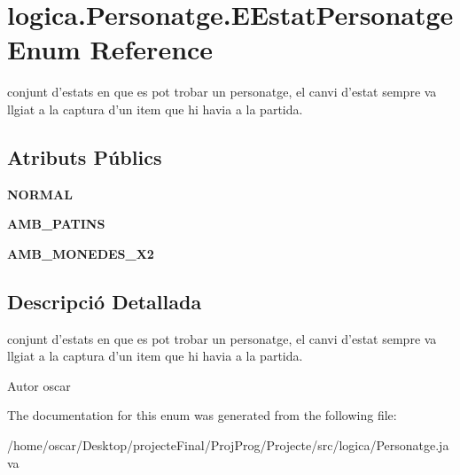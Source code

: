 \hypertarget{enumlogica_1_1_personatge_1_1_e_estat_personatge}{\section{logica.\+Personatge.\+E\+Estat\+Personatge Enum Reference}
\label{enumlogica_1_1_personatge_1_1_e_estat_personatge}
}


conjunt d'estats en que es pot trobar un personatge, el canvi d'estat sempre va llgiat a la captura d'un item que hi havia a la partida.  


\subsection*{Atributs Públics}
\begin{DoxyCompactItemize}
\item 
\hypertarget{enumlogica_1_1_personatge_1_1_e_estat_personatge_a49d6707f77621ec0cf2e87fe0c3c35b6}{{\bfseries N\+O\+R\+M\+A\+L}}\label{enumlogica_1_1_personatge_1_1_e_estat_personatge_a49d6707f77621ec0cf2e87fe0c3c35b6}

\item 
\hypertarget{enumlogica_1_1_personatge_1_1_e_estat_personatge_a40e2b5b6b8e3353416efee27e6968dc2}{{\bfseries A\+M\+B\+\_\+\+P\+A\+T\+I\+N\+S}}\label{enumlogica_1_1_personatge_1_1_e_estat_personatge_a40e2b5b6b8e3353416efee27e6968dc2}

\item 
\hypertarget{enumlogica_1_1_personatge_1_1_e_estat_personatge_ab999766c5100bbcaa40fa54069c8f4d3}{{\bfseries A\+M\+B\+\_\+\+M\+O\+N\+E\+D\+E\+S\+\_\+\+X2}}\label{enumlogica_1_1_personatge_1_1_e_estat_personatge_ab999766c5100bbcaa40fa54069c8f4d3}

\end{DoxyCompactItemize}


\subsection{Descripció Detallada}
conjunt d'estats en que es pot trobar un personatge, el canvi d'estat sempre va llgiat a la captura d'un item que hi havia a la partida. 

\begin{DoxyAuthor}{Autor}
oscar 
\end{DoxyAuthor}


The documentation for this enum was generated from the following file\+:\begin{DoxyCompactItemize}
\item 
/home/oscar/\+Desktop/projecte\+Final/\+Proj\+Prog/\+Projecte/src/logica/Personatge.\+java\end{DoxyCompactItemize}
